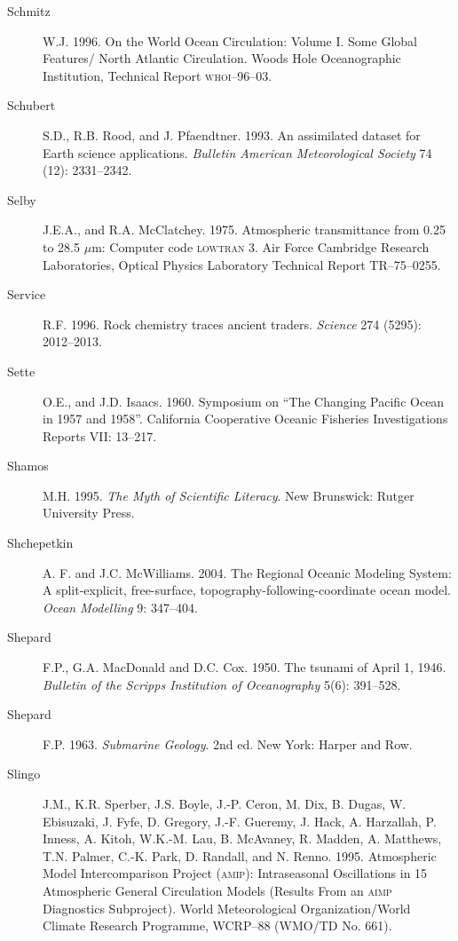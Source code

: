 \begin{description}
\item [Schmitz]W.J. 1996. On the World Ocean Circulation: Volume
  I. Some Global Features/ North Atlantic Circulation. Woods Hole
  Oceanographic Institution, Technical Report \textsc{whoi}--96--03.

\item [Schubert]S.D., R.B. Rood, and J. Pfaendtner. 1993. An
  assimilated dataset for Earth science applications. \textit{Bulletin
    American Meteorological Society} 74 (12): 2331--2342.

\item [Selby]J.E.A., and R.A. McClatchey. 1975. Atmospheric
  transmittance from 0.25 to 28.5 $\mu$m: Computer code
  \textsc{lowtran} 3. Air Force Cambridge Research Laboratories,
  Optical Physics Laboratory Technical Report TR--75--0255.

\item [Service]R.F. 1996. Rock chemistry traces ancient
  traders. \textit{Science} 274 (5295): 2012--2013.

\item[Sette]O.E., and J.D. Isaacs. 1960. Symposium on ``The Changing
  Pacific Ocean in 1957 and 1958''. California Cooperative Oceanic
  Fisheries Investigations Reports VII: 13--217.

\item [Shamos]M.H. 1995. \textit{The Myth of Scientific Literacy}. New
  Brunswick: Rutger University Press.

\item [Shchepetkin]A. F. and J.C. McWilliams. 2004. The Regional
  Oceanic Modeling System: A split-explicit, free-surface,
  topography-following-coordinate ocean model. \textit{Ocean
    Modelling} 9: 347--404.

\item [Shepard]F.P., G.A. MacDonald and D.C. Cox. 1950. The tsunami of
  April 1, 1946. \textit{Bulletin of the Scripps Institution of
    Oceanography} 5(6): 391--528.

\item [Shepard]F.P. 1963. \textit{Submarine Geology}. 2nd ed. New
  York: Harper and Row.

\item [Slingo]J.M., K.R. Sperber, J.S. Boyle, J.-P. Ceron, M. Dix,
  B. Dugas, W. Ebisuzaki, J. Fyfe, D. Gregory, J.-F. Gueremy, J. Hack,
  A. Harzallah, P. Inness, A. Kitoh, W.K.-M. Lau, B. McAvaney,
  R. Madden, A. Matthews, T.N. Palmer, C.-K. Park, D. Randall, and
  N. Renno. 1995. Atmospheric Model Intercomparison Project
  (\textsc{amip}): Intraseasonal Oscillations in 15 Atmospheric
  General Circulation Models (Results From an \textsc{aimp}
  Diagnostics Subproject). World Meteorological Organization/World
  Climate Research Programme, WCRP--88 (WMO/TD No. 661).


\end{description}
